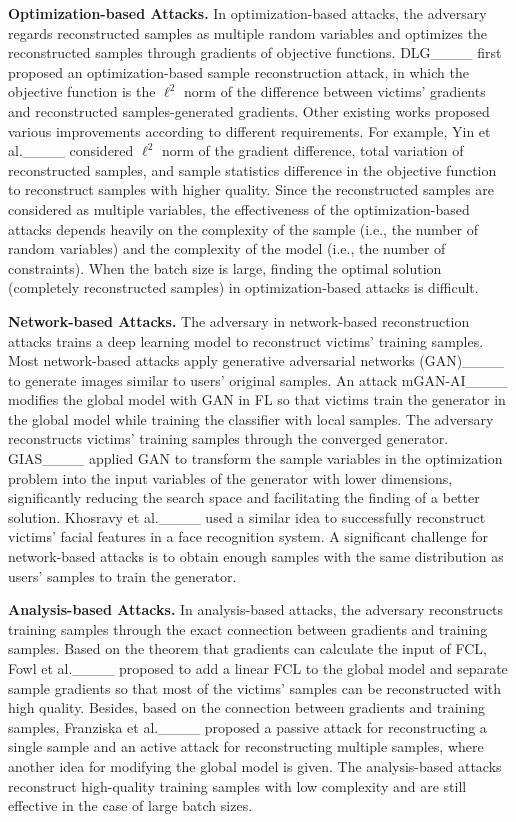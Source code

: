 \textbf{Optimization-based Attacks.}
In optimization-based attacks, the adversary regards reconstructed samples as multiple random variables and optimizes the reconstructed samples through gradients of objective functions. DLG____ first proposed an optimization-based sample reconstruction attack, in which the objective function is the $\ell^2$ norm of the difference between victims' gradients and reconstructed samples-generated gradients. Other existing works proposed various improvements according to different requirements. For example, Yin et al.____ considered $\ell^2$ norm of the gradient difference, total variation of reconstructed samples, and sample statistics difference in the objective function to reconstruct samples with higher quality. Since the reconstructed samples are considered as multiple variables, the effectiveness of the optimization-based attacks depends heavily on the complexity of the sample (i.e., the number of random variables) and the complexity of the model (i.e., the number of constraints). When the batch size is large, finding the optimal solution (completely reconstructed samples) in optimization-based attacks is difficult.

\textbf{Network-based Attacks.}
The adversary in network-based reconstruction attacks trains a deep learning model to reconstruct victims' training samples. Most network-based attacks apply generative adversarial networks (GAN)____ to generate images similar to users' original samples. An attack mGAN-AI____ modifies the global model with GAN in FL so that victims train the generator in the global model while training the classifier with local samples. The adversary reconstructs victims' training samples through the converged generator. GIAS____ applied GAN to transform the sample variables in the optimization problem into the input variables of the generator with lower dimensions, significantly reducing the search space and facilitating the finding of a better solution. Khosravy et al.____ used a similar idea to successfully reconstruct victims' facial features in a face recognition system. A significant challenge for network-based attacks is to obtain enough samples with the same distribution as users' samples to train the generator.

\textbf{Analysis-based Attacks.} In analysis-based attacks, the adversary reconstructs training samples through the exact connection between gradients and training samples. Based on the theorem that gradients can calculate the input of FCL, Fowl et al.____ proposed to add a linear FCL to the global model and separate sample gradients so that most of the victims' samples can be reconstructed with high quality. Besides, based on the connection between gradients and training samples, Franziska et al.____ proposed a passive attack for reconstructing a single sample and an active attack for reconstructing multiple samples, where another idea for modifying the global model is given. The analysis-based attacks reconstruct high-quality training samples with low complexity and are still effective in the case of large batch sizes.

